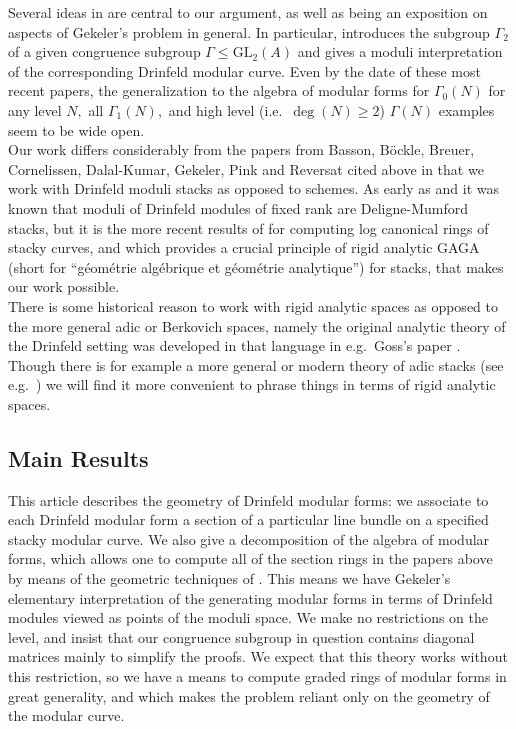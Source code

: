 \documentclass[11pt]{amsart}
\theoremstyle{definition}
\numberwithin{equation}{section}
\newcommand{\GL}{\mathrm{GL}} 	%
\begin{document}
		Several ideas in \cite{Breuer-Gekeler-h-function} are central to our argument, as well as being an exposition on aspects of Gekeler's problem in general. In particular, \cite{Breuer-Gekeler-h-function} introduces the subgroup $\Gamma_2$ of a given congruence subgroup $\Gamma\leq\GL_2(A)$ and gives a moduli interpretation of the corresponding Drinfeld modular curve. Even by the date of these most recent papers, the generalization to the algebra of modular forms for $\Gamma_0(N)$ for any level $N,$ all $\Gamma_1(N),$ and high level (i.e.\ $\deg(N)\geq 2$) $\Gamma(N)$ examples seem to be wide open.\\
		
		Our work differs considerably from the papers from Basson, B\"ockle, Breuer, Cornelissen, Dalal-Kumar, Gekeler, Pink and Reversat cited above in that we work with Drinfeld moduli stacks as opposed to schemes. As early as \cite{Gekeler-Curves} and \cite{Laumon-cohomology-Drinfeld-modular-varieties} it was known that moduli of Drinfeld modules of fixed rank are Deligne-Mumford stacks, but it is the more recent results of \cite{VZB} for computing log canonical rings of stacky curves, and \cite{Porta-Yu-Higher-analytic-stacks-GAGA} which provides a crucial principle of rigid analytic GAGA (short for ``g\'eom\'etrie alg\'ebrique et g\'eom\'etrie analytique'') for stacks, that makes our work possible.\\
		
		There is some historical reason to work with rigid analytic spaces as opposed to the more general adic or Berkovich spaces, namely the original analytic theory of the Drinfeld setting was developed in that language in e.g.\ Goss's paper \cite{Goss-upper-halfplane}. Though there is for example a more general or modern theory of adic stacks (see e.g.\ \cite{Warner-thesis-adic-moduli-spaces}) we will find it more convenient to phrase things in terms of rigid analytic spaces.
		
		\subsection{Main Results}
		
		This article describes the geometry of Drinfeld modular forms: we associate to each Drinfeld modular form a section of a particular line bundle on a specified stacky modular curve.
		We also give a decomposition of the algebra of modular forms, which allows one to compute all of the section rings in the papers above by means of the geometric techniques of \cite{VZB}. This means we have Gekeler's elementary interpretation of the generating modular forms in terms of Drinfeld modules viewed as points of the moduli space. We make no restrictions on the level, and insist that our congruence subgroup in question contains diagonal matrices mainly to simplify the proofs. We expect that this theory works without this restriction, so we have a means to compute graded rings of modular forms in great generality, and which makes the problem reliant only on the geometry of the modular curve.\\   
		
\end{document}
